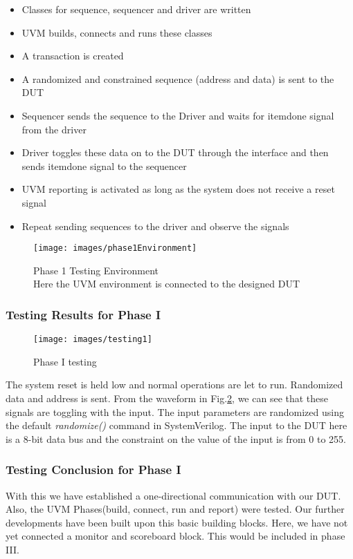 \documentclass[a4paper,11pt]{article}
\begin{document}
\begin{itemize}[noitemsep]
\item Classes for sequence, sequencer and driver are written
\item UVM builds, connects and runs these classes
\item A transaction is created
\item A randomized and constrained sequence (address and data) is sent to the DUT
\item Sequencer sends the sequence to the Driver and waits for item\textunderscore done signal from the driver
\item Driver toggles these data on to the DUT through the interface and then sends item\textunderscore done signal to the sequencer
\item UVM reporting is activated as long as the system does not receive a reset signal
\item Repeat sending sequences to the driver and observe the signals
\end{itemize}

\begin{figure}[ht]
\centering
\texttt{[image: images/phase1Environment]}
\caption{Phase 1 Testing Environment\\Here the UVM environment is connected to the designed DUT}
\label{fig: Phase I testing enviroment}
\end{figure}

\subsubsection{Testing Results for Phase I}

\begin{figure}[ht]
\centering
\texttt{[image: images/testing1]}
\caption{Phase I testing}
\label{fig: Phase I Testing}
\end{figure}

The system reset is held low and normal operations are let to run. Randomized data and address is sent. From the waveform in Fig.\ref{fig: Phase I Testing}, we can see that these signals are toggling with the input. The input parameters are randomized using the default \textit{randomize()} command in SystemVerilog. The input to the DUT here is a 8-bit data bus and the constraint on the value of the input is from 0 to 255. 

\subsubsection{Testing Conclusion for Phase I}
With this we have established a one-directional communication with our DUT. Also, the UVM Phases(build, connect, run and report) were tested. Our further developments have been built upon this basic building blocks. Here, we have not yet connected a monitor and scoreboard block. This would be included in phase III.
\ \\
\FloatBarrier
\end{document}
